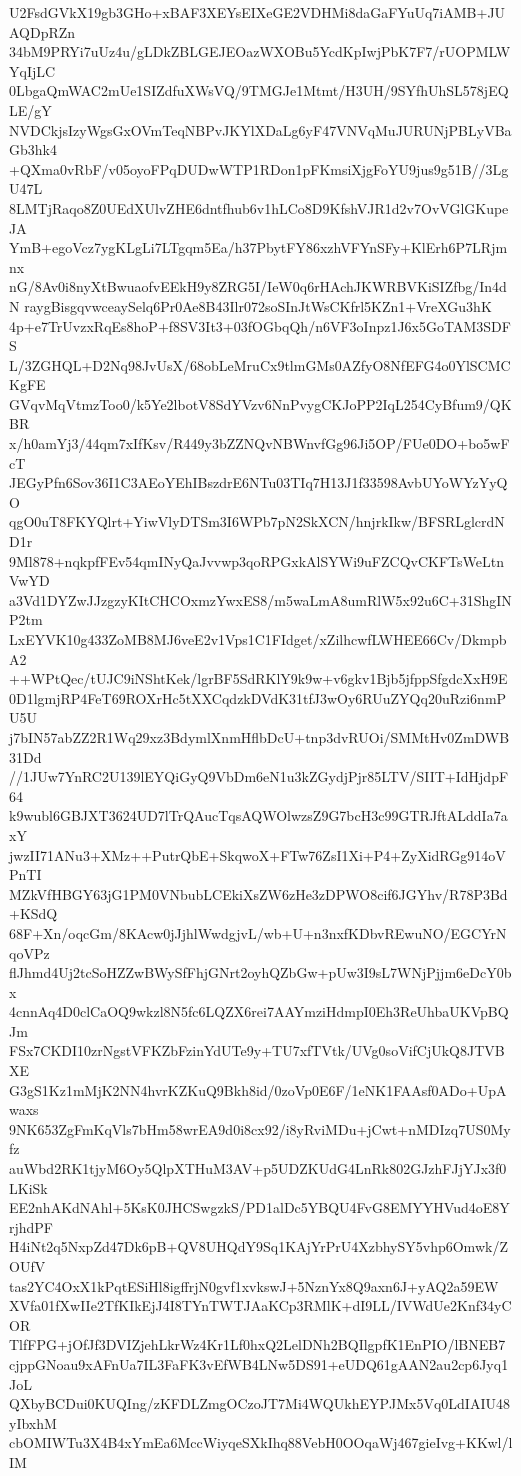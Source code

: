 U2FsdGVkX19gb3GHo+xBAF3XEYsEIXeGE2VDHMi8daGaFYuUq7iAMB+JUAQDpRZn
34bM9PRYi7uUz4u/gLDkZBLGEJEOazWXOBu5YcdKpIwjPbK7F7/rUOPMLWYqIjLC
0LbgaQmWAC2mUe1SIZdfuXWsVQ/9TMGJe1Mtmt/H3UH/9SYfhUhSL578jEQLE/gY
NVDCkjsIzyWgsGxOVmTeqNBPvJKYlXDaLg6yF47VNVqMuJURUNjPBLyVBaGb3hk4
+QXma0vRbF/v05oyoFPqDUDwWTP1RDon1pFKmsiXjgFoYU9jus9g51B//3LgU47L
8LMTjRaqo8Z0UEdXUlvZHE6dntfhub6v1hLCo8D9KfshVJR1d2v7OvVGlGKupeJA
YmB+egoVcz7ygKLgLi7LTgqm5Ea/h37PbytFY86xzhVFYnSFy+KlErh6P7LRjmnx
nG/8Av0i8nyXtBwuaofvEEkH9y8ZRG5I/IeW0q6rHAchJKWRBVKiSIZfbg/In4dN
raygBisgqvwceaySelq6Pr0Ae8B43Ilr072soSInJtWsCKfrl5KZn1+VreXGu3hK
4p+e7TrUvzxRqEs8hoP+f8SV3It3+03fOGbqQh/n6VF3oInpz1J6x5GoTAM3SDFS
L/3ZGHQL+D2Nq98JvUsX/68obLeMruCx9tlmGMs0AZfyO8NfEFG4o0YlSCMCKgFE
GVqvMqVtmzToo0/k5Ye2lbotV8SdYVzv6NnPvygCKJoPP2IqL254CyBfum9/QKBR
x/h0amYj3/44qm7xIfKsv/R449y3bZZNQvNBWnvfGg96Ji5OP/FUe0DO+bo5wFcT
JEGyPfn6Sov36I1C3AEoYEhIBszdrE6NTu03TIq7H13J1f33598AvbUYoWYzYyQO
qgO0uT8FKYQlrt+YiwVlyDTSm3I6WPb7pN2SkXCN/hnjrkIkw/BFSRLglcrdND1r
9Ml878+nqkpfFEv54qmINyQaJvvwp3qoRPGxkAlSYWi9uFZCQvCKFTsWeLtnVwYD
a3Vd1DYZwJJzgzyKItCHCOxmzYwxES8/m5waLmA8umRlW5x92u6C+31ShgINP2tm
LxEYVK10g433ZoMB8MJ6veE2v1Vps1C1FIdget/xZilhcwfLWHEE66Cv/DkmpbA2
++WPtQec/tUJC9iNShtKek/lgrBF5SdRKlY9k9w+v6gkv1Bjb5jfppSfgdcXxH9E
0D1lgmjRP4FeT69ROXrHc5tXXCqdzkDVdK31tfJ3wOy6RUuZYQq20uRzi6nmPU5U
j7bIN57abZZ2R1Wq29xz3BdymlXnmHflbDcU+tnp3dvRUOi/SMMtHv0ZmDWB31Dd
//1JUw7YnRC2U139lEYQiGyQ9VbDm6eN1u3kZGydjPjr85LTV/SIIT+IdHjdpF64
k9wubl6GBJXT3624UD7lTrQAucTqsAQWOlwzsZ9G7bcH3c99GTRJftALddIa7axY
jwzII71ANu3+XMz++PutrQbE+SkqwoX+FTw76ZsI1Xi+P4+ZyXidRGg914oVPnTI
MZkVfHBGY63jG1PM0VNbubLCEkiXsZW6zHe3zDPWO8cif6JGYhv/R78P3Bd+KSdQ
68F+Xn/oqcGm/8KAcw0jJjhlWwdgjvL/wb+U+n3nxfKDbvREwuNO/EGCYrNqoVPz
flJhmd4Uj2tcSoHZZwBWySfFhjGNrt2oyhQZbGw+pUw3I9sL7WNjPjjm6eDcY0bx
4cnnAq4D0clCaOQ9wkzl8N5fc6LQZX6rei7AAYmziHdmpI0Eh3ReUhbaUKVpBQJm
FSx7CKDI10zrNgstVFKZbFzinYdUTe9y+TU7xfTVtk/UVg0soVifCjUkQ8JTVBXE
G3gS1Kz1mMjK2NN4hvrKZKuQ9Bkh8id/0zoVp0E6F/1eNK1FAAsf0ADo+UpAwaxs
9NK653ZgFmKqVls7bHm58wrEA9d0i8cx92/i8yRviMDu+jCwt+nMDIzq7US0Myfz
auWbd2RK1tjyM6Oy5QlpXTHuM3AV+p5UDZKUdG4LnRk802GJzhFJjYJx3f0LKiSk
EE2nhAKdNAhl+5KsK0JHCSwgzkS/PD1alDc5YBQU4FvG8EMYYHVud4oE8YrjhdPF
H4iNt2q5NxpZd47Dk6pB+QV8UHQdY9Sq1KAjYrPrU4XzbhySY5vhp6Omwk/ZOUfV
tas2YC4OxX1kPqtESiHl8igffrjN0gvf1xvkswJ+5NznYx8Q9axn6J+yAQ2a59EW
XVfa01fXwIIe2TfKIkEjJ4I8TYnTWTJAaKCp3RMlK+dI9LL/IVWdUe2Knf34yCOR
TlfFPG+jOfJf3DVIZjehLkrWz4Kr1Lf0hxQ2LelDNh2BQIlgpfK1EnPIO/lBNEB7
cjppGNoau9xAFnUa7IL3FaFK3vEfWB4LNw5DS91+eUDQ61gAAN2au2cp6Jyq1JoL
QXbyBCDui0KUQIng/zKFDLZmgOCzoJT7Mi4WQUkhEYPJMx5Vq0LdIAIU48yIbxhM
cbOMIWTu3X4B4xYmEa6MccWiyqeSXkIhq88VebH0OOqaWj467gieIvg+KKwl/lIM
